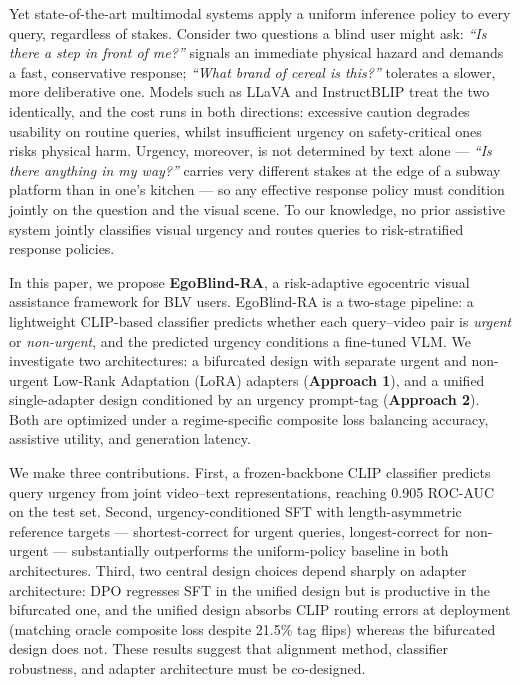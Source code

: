 \documentclass{article}
\begin{document}
Yet state-of-the-art multimodal systems apply a uniform inference policy to every query, regardless of stakes. Consider two questions a blind user might ask: \textit{``Is there a step in front of me?''} signals an immediate physical hazard and demands a fast, conservative response; \textit{``What brand of cereal is this?''} tolerates a slower, more deliberative one. Models such as LLaVA \cite{liu2023llava} and InstructBLIP \cite{dai2023instructblip} treat the two identically, and the cost runs in both directions: excessive caution degrades usability on routine queries, whilst insufficient urgency on safety-critical ones risks physical harm. Urgency, moreover, is not determined by text alone --- \textit{``Is there anything in my way?''} carries very different stakes at the edge of a subway platform than in one's kitchen --- so any effective response policy must condition jointly on the question and the visual scene. To our knowledge, no prior assistive system jointly classifies visual urgency and routes queries to risk-stratified response policies.

In this paper, we propose \textbf{EgoBlind-RA}, a risk-adaptive egocentric visual assistance framework for BLV users. EgoBlind-RA is a two-stage pipeline: a lightweight CLIP-based classifier predicts whether each query--video pair is \textit{urgent} or \textit{non-urgent}, and the predicted urgency conditions a fine-tuned VLM. We investigate two architectures: a bifurcated design with separate urgent and non-urgent Low-Rank Adaptation (LoRA) adapters (\textbf{Approach 1}), and a unified single-adapter design conditioned by an urgency prompt-tag (\textbf{Approach 2}). Both are optimized under a regime-specific composite loss balancing accuracy, assistive utility, and generation latency.

We make three contributions. First, a frozen-backbone CLIP classifier predicts query urgency from joint video--text representations, reaching 0.905 ROC-AUC on the test set. Second, urgency-conditioned SFT with length-asymmetric reference targets --- shortest-correct for urgent queries, longest-correct for non-urgent --- substantially outperforms the uniform-policy baseline in both architectures. Third, two central design choices depend sharply on adapter architecture: DPO regresses SFT in the unified design but is productive in the bifurcated one, and the unified design absorbs CLIP routing errors at deployment (matching oracle composite loss despite 21.5\% tag flips) whereas the bifurcated design does not. These results suggest that alignment method, classifier robustness, and adapter architecture must be co-designed.
\end{document}

